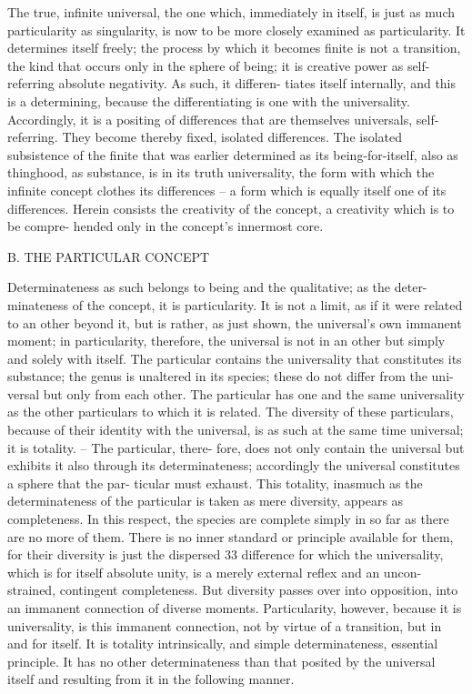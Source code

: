 The true, infinite universal, the one which, immediately in itself, is just
as much particularity as singularity, is now to be more closely examined
as particularity. It determines itself freely; the process by which it becomes
finite is not a transition, the kind that occurs only in the sphere of being;
it is creative power as self-referring absolute negativity. As such, it differen-
tiates itself internally, and this is a determining, because the differentiating
is one with the universality. Accordingly, it is a positing of differences
that are themselves universals, self-referring. They become thereby fixed,
isolated differences. The isolated subsistence of the finite that was earlier
determined as its being-for-itself, also as thinghood, as substance, is in
its truth universality, the form with which the infinite concept clothes its
differences – a form which is equally itself one of its differences. Herein
consists the creativity of the concept, a creativity which is to be compre-
hended only in the concept’s innermost core.

B. THE PARTICULAR CONCEPT

Determinateness as such belongs to being and the qualitative; as the deter-
minateness of the concept, it is particularity. It is not a limit, as if it were
related to an other beyond it, but is rather, as just shown, the universal’s
own immanent moment; in particularity, therefore, the universal is not in
an other but simply and solely with itself.
The particular contains the universality that constitutes its substance;
the genus is unaltered in its species; these do not differ from the uni-
versal but only from each other. The particular has one and the same
universality as the other particulars to which it is related. The diversity
of these particulars, because of their identity with the universal, is as
such at the same time universal; it is totality. – The particular, there-
fore, does not only contain the universal but exhibits it also through its
determinateness; accordingly the universal constitutes a sphere that the par-
ticular must exhaust. This totality, inasmuch as the determinateness of
the particular is taken as mere diversity, appears as completeness. In this
respect, the species are complete simply in so far as there are no more
of them. There is no inner standard or principle available for them, for
their diversity is just the dispersed 33 difference for which the universality,
which is for itself absolute unity, is a merely external reflex and an uncon-
strained, contingent completeness. But diversity passes over into opposition,
into an immanent connection of diverse moments. Particularity, however,
because it is universality, is this immanent connection, not by virtue of
a transition, but in and for itself. It is totality intrinsically, and simple
determinateness, essential principle. It has no other determinateness than
that posited by the universal itself and resulting from it in the following
manner.

